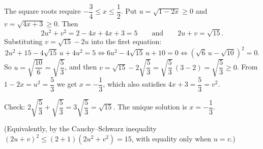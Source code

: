 The square roots require $-\dfrac34\le x\le\dfrac12$. Put $u=\sqrt{1-2x}\ge0$ and $v=\sqrt{4x+3}\ge0$. Then
\[2u^2+v^2=2-4x+4x+3=5\qquad\text{and}\qquad 2u+v=\sqrt{15}.\]
Substituting $v=\sqrt{15}-2u$ into the first equation:
\[2u^2+15-4\sqrt{15}\,u+4u^2=5\iff6u^2-4\sqrt{15}\,u+10=0\iff\left(\sqrt6\,u-\sqrt{10}\right)^2=0.\]
So $u=\sqrt{\dfrac{10}{6}}=\sqrt{\dfrac53}$, and then $v=\sqrt{15}-2\sqrt{\dfrac53}=\sqrt{\dfrac53}\,(3-2)=\sqrt{\dfrac53}\ge0$. From $1-2x=u^2=\dfrac53$ we get $x=-\dfrac13$, which also satisfies $4x+3=\dfrac53=v^2$.

Check: $2\sqrt{\dfrac53}+\sqrt{\dfrac53}=3\sqrt{\dfrac53}=\sqrt{15}$. The unique solution is $\boxed{x=-\dfrac13}$.

(Equivalently, by the Cauchy--Schwarz inequality $(2u+v)^2\le(2+1)\left(2u^2+v^2\right)=15$, with equality only when $u=v$.)
